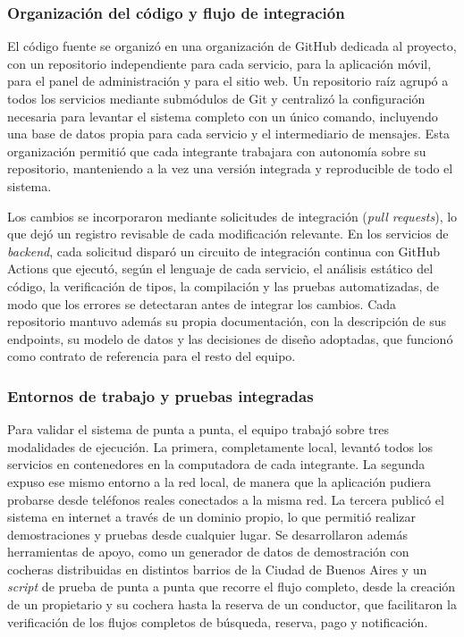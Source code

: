 \subsubsection{Organización del código y flujo de integración}

El código fuente se organizó en una organización de GitHub dedicada al proyecto, con un repositorio independiente para cada servicio, para la aplicación móvil, para el panel de administración y para el sitio web. Un repositorio raíz agrupó a todos los servicios mediante submódulos de Git y centralizó la configuración necesaria para levantar el sistema completo con un único comando, incluyendo una base de datos propia para cada servicio y el intermediario de mensajes. Esta organización permitió que cada integrante trabajara con autonomía sobre su repositorio, manteniendo a la vez una versión integrada y reproducible de todo el sistema.

Los cambios se incorporaron mediante solicitudes de integración (\textit{pull requests}), lo que dejó un registro revisable de cada modificación relevante. En los servicios de \textit{backend}, cada solicitud disparó un circuito de integración continua con GitHub Actions que ejecutó, según el lenguaje de cada servicio, el análisis estático del código, la verificación de tipos, la compilación y las pruebas automatizadas, de modo que los errores se detectaran antes de integrar los cambios. Cada repositorio mantuvo además su propia documentación, con la descripción de sus endpoints, su modelo de datos y las decisiones de diseño adoptadas, que funcionó como contrato de referencia para el resto del equipo.

\subsubsection{Entornos de trabajo y pruebas integradas}

Para validar el sistema de punta a punta, el equipo trabajó sobre tres modalidades de ejecución. La primera, completamente local, levantó todos los servicios en contenedores en la computadora de cada integrante. La segunda expuso ese mismo entorno a la red local, de manera que la aplicación pudiera probarse desde teléfonos reales conectados a la misma red. La tercera publicó el sistema en internet a través de un dominio propio, lo que permitió realizar demostraciones y pruebas desde cualquier lugar. Se desarrollaron además herramientas de apoyo, como un generador de datos de demostración con cocheras distribuidas en distintos barrios de la Ciudad de Buenos Aires y un \textit{script} de prueba de punta a punta que recorre el flujo completo, desde la creación de un propietario y su cochera hasta la reserva de un conductor, que facilitaron la verificación de los flujos completos de búsqueda, reserva, pago y notificación.

